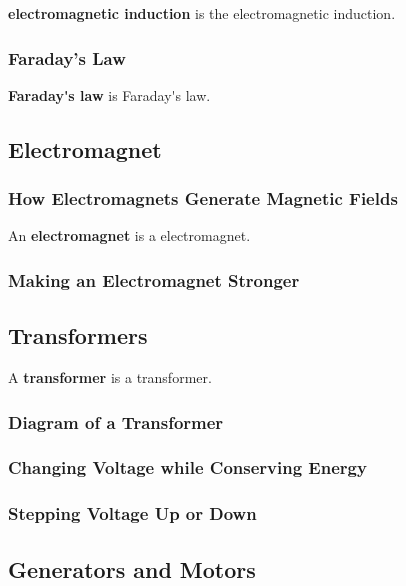 \documentclass[dvipsnames]{article}
\begin{document}
\textbf{\Gls{electromagnetic induction}} is the \glsdesc{electromagnetic induction}.

\subsubsection{Faraday's Law}

\textbf{\gls{Faraday's law}} is \glsdesc{Faraday's law}.

\clearpage

\subsection{Electromagnet}

\subsubsection{How Electromagnets Generate Magnetic Fields}

An \textbf{\gls{electromagnet}} is a \glsdesc{electromagnet}.

\subsubsection{Making an Electromagnet Stronger}

\subsection{Transformers}

A \textbf{\gls{transformer}} is a \glsdesc{transformer}.

\subsubsection{Diagram of a Transformer}

\subsubsection{Changing Voltage while Conserving Energy}

\subsubsection{Stepping Voltage Up or Down}

\subsection{Generators and Motors}
\end{document}
